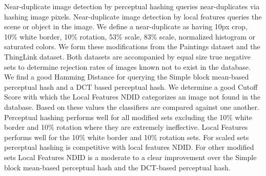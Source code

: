 \documentclass[english,12pt,a4paper,pdftex,elec,utf8, table]{aaltothesis}
\begin{document}


\makecoverpage



\begin{abstractpage}[english]
  Near-duplicate image detection by perceptual hashing queries near-duplicates via hashing image pixels. Near-duplicate image detection by local features queries the scene or object in the image. We define a near-duplicate as having 10px crop, 10\% white border, 10\% rotation, 53\% scale, 83\% scale, normalized histogram or saturated colors. We form these modifications from the Paintings dataset and the ThingLink dataset. Both datasets are accompanied by equal size true negative sets to determine rejection rates of images known not to exist in the database. We find a good Hamming Distance for querying the Simple block mean-based perceptual hash and a DCT based perceptual hash. We determine a good Cutoff Score with which the Local Features NDID categorizes an image not found in the database. Based on these values the classifiers are compared against one another. Perceptual hashing performs well for all modified sets excluding the 10\% white border and 10\% rotation where they are extremely ineffective. Local Features performs well for the 10\% white border and 10\% rotation sets. For scaled sets perceptual hashing is competitive with local features NDID. For other modified sets Local Features NDID is a moderate to a clear improvement over the Simple block mean-based perceptual hash and the DCT-based perceptual hash.
\end{abstractpage}
\end{document}
